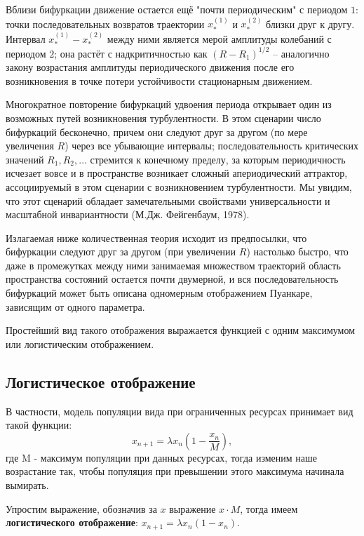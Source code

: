 Вблизи бифуркации движение остается ещё "почти периодическим" с периодом $1$: точки последовательных возвратов траектории $x_*^{(1)}$ и $x_*^{(2)}$ близки друг к другу. Интервал $x_*^{(1)} - x_*^{(2)}$ между ними является мерой амплитуды колебаний с периодом $2$; она растёт с надкритичностью как $(R - R_1)^{1/2}$ -- аналогично закону возрастания амплитуды периодического движения после его возникновения в точке потери устойчивости стационарным движением.

Многократное повторение бифуркаций удвоения периода открывает один из возможных путей возникновения турбулентности. В этом сценарии число бифуркаций бесконечно, причем они следуют друг за другом (по мере увеличения $R$) через все убывающие интервалы; последовательность критических значений $R_1, R_2, \ldots$ стремится к конечному пределу, за которым периодичность исчезает вовсе и в пространстве возникает сложный апериодический аттрактор, ассоциируемый в этом сценарии с возникновением турбулентности. 
Мы увидим, что этот сценарий обладает замечательными свойствами универсальности и масштабной инвариантности (М.Дж. Фейгенбаум, 1978).

Излагаемая ниже количественная теория исходит из предпосылки, что бифуркации следуют друг за другом (при увеличении 
$R$) настолько быстро, что даже в промежутках между ними занимаемая множеством траекторий область пространства состояний остается почти двумерной, и вся последовательность бифуркаций может быть описана одномерным отображением Пуанкаре, зависящим от одного параметра.

Простейший вид такого отображения выражается функцией с одним максимумом или логистическим отображением.

\subsection{Логистическое отображение}

В частности, модель популяции вида при ограниченных ресурсах принимает вид такой функции:
\begin{equation}
    x_{n+1} = \lambda x_n \left( 1 - \frac{x_n}{M}  \right),
\end{equation}
где M - максимум популяции при данных ресурсах, тогда изменим наше возрастание так, чтобы популяция при превышении этого максимума начинала вымирать.

Упростим выражение, обозначив за $x$ выражение $x \cdot M$, тогда имеем \textbf{логистического отображение}: $x_{n+1} = \lambda x_n \left( 1 - x_n  \right).$

